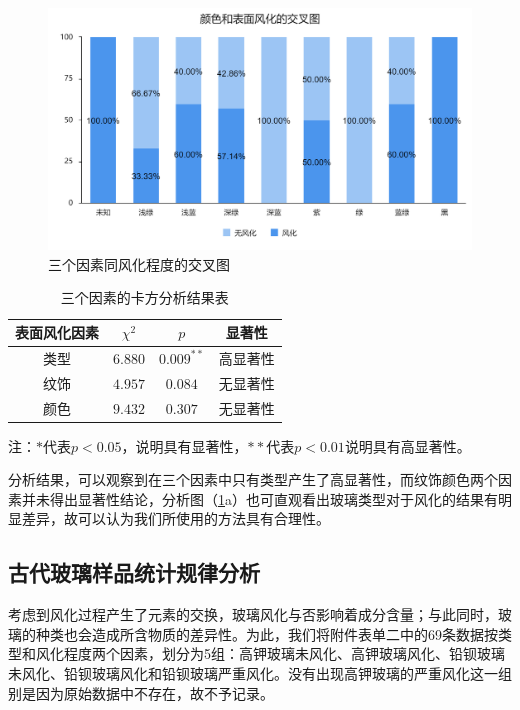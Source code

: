 \documentclass{my_paper}
\begin{document}
\begin{figure}[htbp]
{\begin{minipage}{0.4\textwidth}
      \includegraphics[width=\textwidth]{croys.png}%
      \end{minipage}
      }
      
  
      \caption{三个因素同风化程度的交叉图}    %
      \label{cro}    %
  \end{figure}

  \begin{table}[ht]
  \centering
  \caption{三个因素的卡方分析结果表}
  \begin{tabular}{cccc}
  \toprule
  表面风化因素&$ \chi^2 $&$ p $&显著性\\\midrule
  类型&$ 6.880 $&$ 0.009^{**} $&高显著性\\
  纹饰&$ 4.957 $&$ 0.084 $&无显著性\\
  颜色&$ 9.432 $&$ 0.307 $&无显著性\\
  \bottomrule
    \end{tabular}

    \vspace{2pt}
    注：$*$代表$p<0.05$，说明具有显著性，$**$代表$p<0.01$说明具有高显著性。
  \label{chi}
    \end{table}
    分析结果，可以观察到在三个因素中只有类型产生了高显著性，而纹饰颜色两个因素并未得出显著性结论，分析图（\ref{cro}a）也可直观看出玻璃类型对于风化的结果有明显差异，故可以认为我们所使用的方法具有合理性。

    \subsection{古代玻璃样品统计规律分析}
    考虑到风化过程产生了元素的交换，玻璃风化与否影响着成分含量；与此同时，玻璃的种类也会造成所含物质的差异性。为此，我们将附件表单二中的69条数据按类型和风化程度两个因素，划分为5组：高钾玻璃未风化、高钾玻璃风化、铅钡玻璃未风化、铅钡玻璃风化和铅钡玻璃严重风化。没有出现高钾玻璃的严重风化这一组别是因为原始数据中不存在，故不予记录。
    
\end{document}
